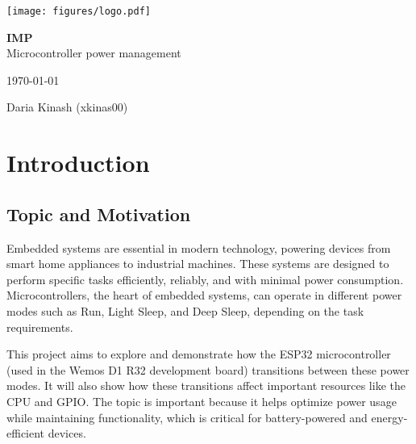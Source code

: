 \documentclass[a4paper, 11pt]{article}
\begin{document}
    \begin{titlepage}
        \begin{center}
            \texttt{[image: figures/logo.pdf]} \\


            \Huge\textbf{ IMP}\\
            \Huge Microcontroller power management

        \end{center}

        \vfill

        \begin{minipage}{0.4\textwidth}
            \Large \today
        \end{minipage}
        \begin{minipage}[b]{0.5\textwidth}
            \begin{flushright}
                \Large
                Daria Kinash (xkinas00) \\
            \end{flushright}
        \end{minipage}
    \end{titlepage}



    \setcounter{page}{1}
    \tableofcontents
    \newpage

    \section{Introduction}

    \subsection{Topic and Motivation}
    Embedded systems are essential in modern technology, powering devices from smart home appliances to industrial machines. These systems are designed to perform specific tasks efficiently, reliably, and with minimal power consumption. Microcontrollers, the heart of embedded systems, can operate in different power modes such as Run, Light Sleep, and Deep Sleep, depending on the task requirements.
    
    This project aims to explore and demonstrate how the ESP32 microcontroller (used in the Wemos D1 R32 development board) transitions between these power modes. It will also show how these transitions affect important resources like the CPU and GPIO. The topic is important because it helps optimize power usage while maintaining functionality, which is critical for battery-powered and energy-efficient devices.
    
\end{document}

